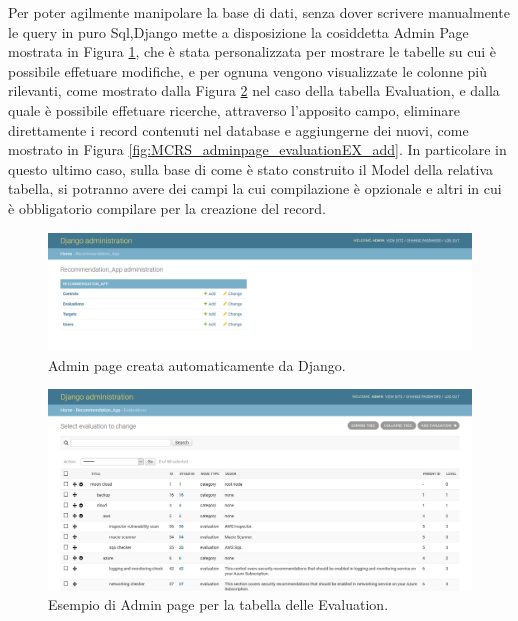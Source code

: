 %
Per poter agilmente manipolare la base di dati, senza dover scrivere manualmente le query in puro Sql,Django mette a disposizione 
la cosiddetta Admin Page mostrata in Figura \ref{fig:MCRS_adminpage}, che è stata personalizzata per mostrare le tabelle su cui è possibile 
effetuare modifiche, e per ognuna vengono visualizzate le colonne più rilevanti, come mostrato dalla 
Figura \ref{fig:MCRS_adminpage_evaluationEX} nel caso della tabella Evaluation, e dalla quale è possibile effetuare ricerche, attraverso 
l'apposito campo, eliminare direttamente i record contenuti nel database e aggiungerne dei nuovi, come mostrato in 
Figura \ref{fig:MCRS_adminpage_evaluationEX_add}.\hfill\break
In particolare in questo ultimo caso, sulla base di come è stato construito il Model della relativa tabella, si potranno avere dei campi 
la cui compilazione è opzionale e altri in cui è obbligatorio compilare per la creazione del record.
%
\begin{figure}
    \includegraphics[scale=0.3]{images/MCRS_adminpage.png}
    \caption{Admin page creata automaticamente da Django.}
    \label{fig:MCRS_adminpage}
\end{figure}
%
\begin{figure}
    \includegraphics[scale=0.3]{images/MCRS_adminpage_evaluationEX.png}
    \caption{Esempio di Admin page per la tabella delle Evaluation.}
    \label{fig:MCRS_adminpage_evaluationEX}
\end{figure}
%
